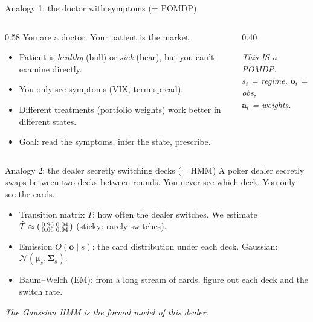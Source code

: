 \documentclass[11pt,aspectratio=169]{beamer}
\begin{document}
\begin{frame}{Analogy 1: the doctor with symptoms (= POMDP)}
\begin{columns}[T]
\begin{column}{0.58\textwidth}
You are a doctor. Your patient is the market.

\bigskip
\begin{itemize}\setlength{\itemsep}{4pt}
  \item Patient is \emph{healthy} (bull) or \emph{sick} (bear), but you can't examine directly.
  \item You only see symptoms (VIX, term spread).
  \item Different treatments (portfolio weights) work better in different states.
  \item Goal: \alert{read the symptoms, infer the state, prescribe}.
\end{itemize}
\end{column}
\begin{column}{0.40\textwidth}\centering
{}

\bigskip\smallskip
\footnotesize\textit{This IS a POMDP.}\\
\textit{$s_t$ = regime, $\mathbf{o}_t$ = obs,}\\
\textit{$\mathbf{a}_t$ = weights.}
\end{column}
\end{columns}
\end{frame}

\begin{frame}{Analogy 2: the dealer secretly switching decks (= HMM)}
A poker dealer secretly swaps between two decks between rounds. You never see which deck. You only see the cards.
\bigskip

\begin{itemize}\setlength{\itemsep}{4pt}
  \item \alert{Transition matrix $T$:} how often the dealer switches. We estimate $\hat T \approx \begin{psmallmatrix}0.96 & 0.04\\ 0.06 & 0.94\end{psmallmatrix}$ (sticky: rarely switches).
  \item \alert{Emission $O(\mathbf{o}\mid s)$:} the card distribution under each deck. Gaussian: $\mathcal{N}(\boldsymbol\mu_s, \boldsymbol\Sigma_s)$.
  \item \alert{Baum--Welch (EM):} from a long stream of cards, figure out each deck and the switch rate.
\end{itemize}

\bigskip
\centering\textit{The Gaussian HMM \emph{is} the formal model of this dealer.}
\end{frame}
\end{document}
